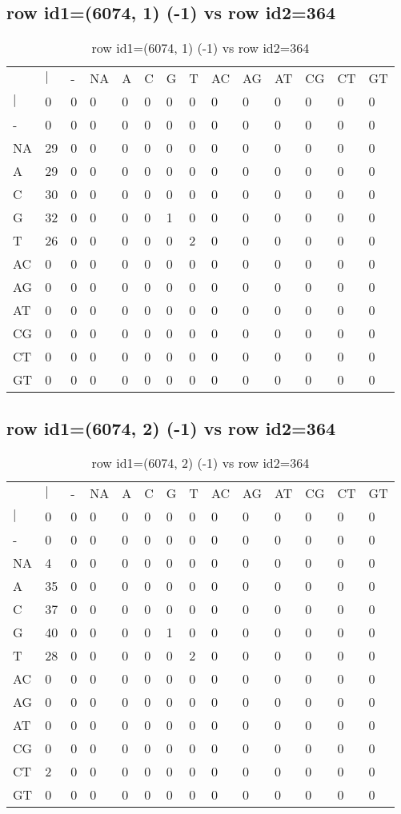 \subsection{row id1=(6074, 1) (-1) vs row id2=364}
\begin{center}
\begin{longtable}{|l|l|l|l|l|l|l|l|l|l|l|l|l|l|}
\caption{row id1=(6074, 1) (-1) vs row id2=364} \label{table_dm46}\\
\hline
\\
\hline
&$|$&-&NA&A&C&G&T&AC&AG&AT&CG&CT&GT\\
$|$&0&0&0&0&0&0&0&0&0&0&0&0&0\\
-&0&0&0&0&0&0&0&0&0&0&0&0&0\\
NA&29&0&0&0&0&0&0&0&0&0&0&0&0\\
A&29&0&0&0&0&0&0&0&0&0&0&0&0\\
C&30&0&0&0&0&0&0&0&0&0&0&0&0\\
G&32&0&0&0&0&1&0&0&0&0&0&0&0\\
T&26&0&0&0&0&0&2&0&0&0&0&0&0\\
AC&0&0&0&0&0&0&0&0&0&0&0&0&0\\
AG&0&0&0&0&0&0&0&0&0&0&0&0&0\\
AT&0&0&0&0&0&0&0&0&0&0&0&0&0\\
CG&0&0&0&0&0&0&0&0&0&0&0&0&0\\
CT&0&0&0&0&0&0&0&0&0&0&0&0&0\\
GT&0&0&0&0&0&0&0&0&0&0&0&0&0\\
\hline
\end{longtable}
\end{center}

\subsection{row id1=(6074, 2) (-1) vs row id2=364}
\begin{center}
\begin{longtable}{|l|l|l|l|l|l|l|l|l|l|l|l|l|l|}
\caption{row id1=(6074, 2) (-1) vs row id2=364} \label{table_dm48}\\
\hline
\\
\hline
&$|$&-&NA&A&C&G&T&AC&AG&AT&CG&CT&GT\\
$|$&0&0&0&0&0&0&0&0&0&0&0&0&0\\
-&0&0&0&0&0&0&0&0&0&0&0&0&0\\
NA&4&0&0&0&0&0&0&0&0&0&0&0&0\\
A&35&0&0&0&0&0&0&0&0&0&0&0&0\\
C&37&0&0&0&0&0&0&0&0&0&0&0&0\\
G&40&0&0&0&0&1&0&0&0&0&0&0&0\\
T&28&0&0&0&0&0&2&0&0&0&0&0&0\\
AC&0&0&0&0&0&0&0&0&0&0&0&0&0\\
AG&0&0&0&0&0&0&0&0&0&0&0&0&0\\
AT&0&0&0&0&0&0&0&0&0&0&0&0&0\\
CG&0&0&0&0&0&0&0&0&0&0&0&0&0\\
CT&2&0&0&0&0&0&0&0&0&0&0&0&0\\
GT&0&0&0&0&0&0&0&0&0&0&0&0&0\\
\hline
\end{longtable}
\end{center}

